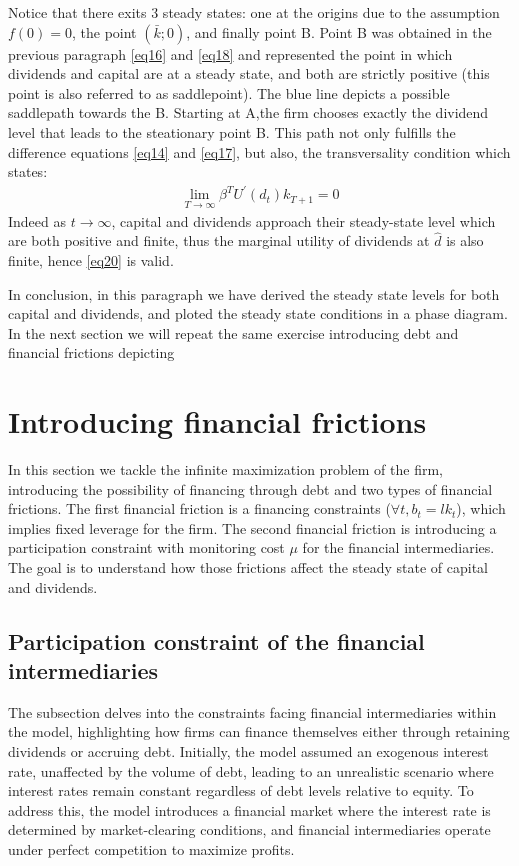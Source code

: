 \documentclass[12pt]{article}
\begin{document}
Notice that there exits 3 steady states: one at the origins due to the assumption \(f(0)=0\), the point \((\bar{k};0)\),
and finally point B. Point B was obtained in the previous paragraph \ref{eq16} and \ref{eq18} and represented the point in
which dividends and capital are at a steady state, and both are strictly positive (this point is also referred to as saddlepoint).
The blue line depicts a possible saddlepath towards the B. Starting at A,the firm chooses exactly the dividend level that
leads to the steationary point B. This path not only fulfills the difference equations \ref{eq14} and \ref{eq17}, but
also, the transversality condition which states:
\begin{align}
    \lim _{T \rightarrow \infty} \beta^T U^{\prime}\left(d_{t}\right) k_{T+1}=0  \label{eq20}
\end{align}
Indeed as \(t \rightarrow \infty\), capital and dividends approach their steady-state level which are both positive and
finite, thus the marginal utility of dividends at \(\hat{d}\) is also finite, hence \ref{eq20} is valid.

In conclusion, in this paragraph we have derived the steady state levels for both capital and dividends, and ploted the
steady state conditions in a phase diagram. In the next section we will repeat the same exercise introducing debt and financial frictions depicting  


\section{Introducing financial frictions}
In this section we tackle the infinite maximization problem of the firm, introducing the possibility of financing through
debt and two types of financial frictions. The first financial friction is a financing constraints (\(\forall t, b_t = l
k_t\)), which implies fixed leverage for the firm. The second financial friction is introducing a participation
constraint with monitoring cost \(\mu\) for the financial intermediaries. The goal is to understand how those frictions
affect the steady state of capital and dividends.

\subsection{Participation constraint of the financial intermediaries } 
The subsection delves into the constraints facing financial intermediaries within the model, highlighting how firms can
finance themselves either through retaining dividends or accruing debt. Initially, the model assumed an exogenous
interest rate, unaffected by the volume of debt, leading to an unrealistic scenario where interest rates remain constant
regardless of debt levels relative to equity. To address this, the model introduces a financial market where the
interest rate is determined by market-clearing conditions, and financial intermediaries operate under perfect
competition to maximize profits.
\end{document}
